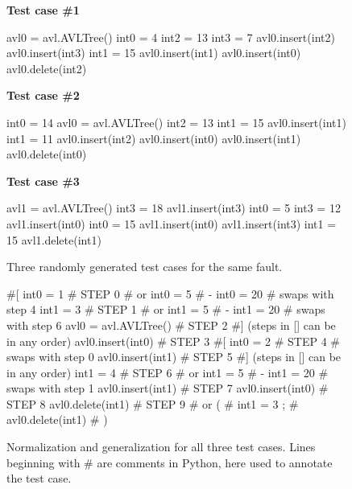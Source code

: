 \begin{figure}
{\scriptsize
{\bf Test case \#1}
\begin{code}
avl0 = avl.AVLTree() 
int0 = 4 
int2 = 13 
int3 = 7 
avl0.insert(int2) 
avl0.insert(int3) 
int1 = 15 
avl0.insert(int1) 
avl0.insert(int0) 
avl0.delete(int2)
\end{code}
{\bf Test case \#2}
\begin{code}
int0 = 14 
avl0 = avl.AVLTree() 
int2 = 13 
int1 = 15 
avl0.insert(int1) 
int1 = 11 
avl0.insert(int2) 
avl0.insert(int0) 
avl0.insert(int1) 
avl0.delete(int0) 
\end{code}
{\bf Test case \#3}
\begin{code}
avl1 = avl.AVLTree() 
int3 = 18 
avl1.insert(int3) 
int0 = 5 
int3 = 12 
avl1.insert(int0) 
int0 = 15 
avl1.insert(int0) 
avl1.insert(int3) 
int1 = 15 
avl1.delete(int1) 
\end{code}
}
\caption {Three randomly generated test cases for the same fault.}
\label{threetests}
\end{figure}

\begin{figure}
{\scriptsize
\begin{code}
\#[
int0 = 1                       \# STEP 0
\#  or int0 = 5 
\#   - int0 = 20 
\#  swaps with step 4
int1 = 3                       \# STEP 1
\#  or int1 = 5 
\#   - int1 = 20 
\#  swaps with step 6
avl0 = avl.AVLTree()           \# STEP 2
\#] (steps in [] can be in any order)
avl0.insert(int0)              \# STEP 3
\#[
int0 = 2                       \# STEP 4
\#  swaps with step 0
avl0.insert(int1)              \# STEP 5
\#] (steps in [] can be in any order)
int1 = 4                       \# STEP 6
\#  or int1 = 5 
\#   - int1 = 20 
\#  swaps with step 1
avl0.insert(int1)              \# STEP 7
avl0.insert(int0)              \# STEP 8
avl0.delete(int1)              \# STEP 9
\#  or (
\#      int1 = 3  ;
\#      avl0.delete(int1) 
\#     )
\end{code}
}
\caption{Normalization and generalization for all three test cases.
  Lines beginning with \# are comments in Python, here used to
annotate the test case.}
\label{normalgen}
\end{figure}